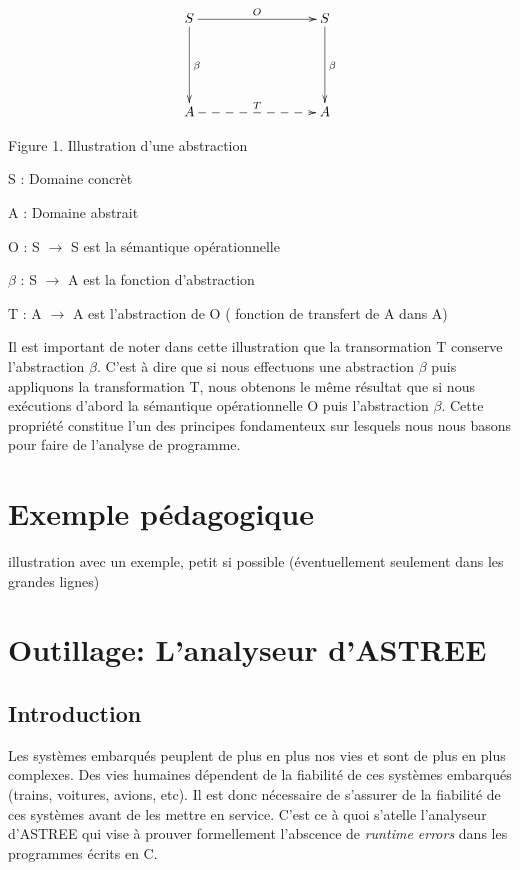 \documentclass[french]{report}
\begin{document}
 \begin{equation*}
  \xymatrix@C+6em@R+3em{
   S \ar[r]^{O} \ar[d]^{\beta} & S \ar[d]^{\beta} \\
    A \ar@{-->}[r]^{T} & A
  }
 \end{equation*}
 
 \begin{center}Figure 1. Illustration d'une abstraction \end{center}
 
\begin{description}
	\item S : Domaine concrèt
    \item A : Domaine abstrait
    \item O : S $\rightarrow$ S est la sémantique opérationnelle
    \item $\beta$ : S $\rightarrow$ A est la fonction d'abstraction
    \item T : A $\rightarrow$ A est l'abstraction de O ( fonction de transfert de A dans A)
\end{description} 

Il est important de noter dans cette illustration que la transormation T conserve l'abstraction $\beta$. C'est à dire que si nous effectuons une abstraction $\beta$ puis appliquons la transformation T, nous obtenons le même résultat que si nous exécutions d'abord la sémantique opérationnelle O puis l'abstraction $\beta$. Cette propriété constitue l'un des principes fondamenteux sur lesquels nous nous basons pour faire de l'analyse de programme.

\section{Exemple pédagogique}

illustration avec un exemple, petit si possible  (éventuellement seulement dans les grandes lignes)

\section{Outillage: L'analyseur d'ASTREE}

\subsection{Introduction}
Les systèmes embarqués peuplent de plus en plus nos vies et sont de plus en plus complexes. Des vies humaines
dépendent de la fiabilité de ces systèmes embarqués (trains, voitures, avions, etc). Il est donc nécessaire de
s'assurer de la fiabilité de ces systèmes avant de les mettre en service.
C'est ce à quoi s'atelle l'analyseur d'ASTREE qui vise à prouver formellement
l'abscence de \textit{runtime errors} dans les programmes écrits en C. \\
\end{document}
